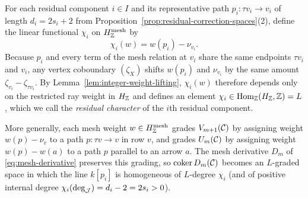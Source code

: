 For each residual component $i\in I$ and its representative path
$p_i:\tau v_i\to v_i$ of length $d_i=2s_i+2$ from
Proposition~\ref{prop:residual-correction-spaces}(2), define the linear
functional $\chi_i$ on $H^{\mathrm{mesh}}_{\mathbb Z}$ by
\begin{equation}
 \chi_i(w)=w(p_i)-\nu_{v_i}.
 \label{eq:parameter-character}
\end{equation}
Because $p_i$ and every term of the mesh relation at $v_i$ share the same
endpoints $\tau v_i$ and $v_i$, any vertex coboundary $(\zeta_X)$ shifts
$w(p_i)$ and $\nu_{v_i}$ by the same amount $\zeta_{v_i}-\zeta_{\tau v_i}$.
By Lemma~\ref{lem:integer-weight-lifting}, $\chi_i(w)$ therefore depends only
on the restricted ray weight in $H_{\mathbb Z}$ and defines an element
$\chi_i\in\operatorname{Hom}_{\mathbb Z}(H_{\mathbb Z},\mathbb Z)=L$, which we call the \emph{residual
character} of the $i$th residual component.

More generally, each mesh weight $w\in H^{\mathrm{mesh}}_{\mathbb Z}$ grades
$V_{m+1}(\mathcal C)$ by assigning weight $w(p)-\nu_v$ to a path $p:\tau v\to v$ in
row $v$, and grades $U_m(\mathcal C)$ by assigning weight $w(p)-w(a)$ to a path $p$
parallel to an arrow $a$. The mesh derivative $D_m$ of
\eqref{eq:mesh-derivative} preserves this grading, so
$\operatorname{coker}D_m(\mathcal C)$ becomes an $L$-graded space in which the line
$k[p_i]$ is homogeneous of $L$-degree $\chi_i$ (and of positive internal
degree $\chi_i(\deg_\mathcal J)=d_i-2=2s_i>0$).

